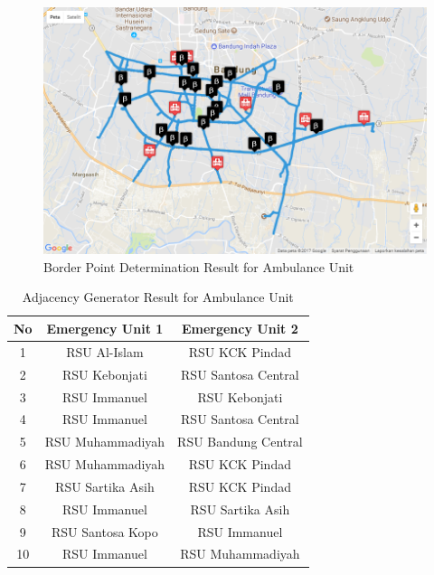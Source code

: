 \begin{figure}[H]
    \centering
    \includegraphics[scale=0.6]{v_border_point_amb.png}
    \caption{Border Point Determination Result for Ambulance Unit}
    \label{fig:bp_amb}
\end{figure}

\begin{table}[H]
\centering
\begin{tabular}{|c|c|c|}
\hline
\textbf{No} & \textbf{Emergency Unit 1} & \textbf{Emergency Unit 2} \\ \hline
1           & RSU Al-Islam              & RSU KCK Pindad            \\ \hline
2           & RSU Kebonjati             & RSU Santosa Central       \\ \hline
3           & RSU Immanuel              & RSU Kebonjati             \\ \hline
4           & RSU Immanuel              & RSU Santosa Central       \\ \hline
5           & RSU Muhammadiyah          & RSU Bandung Central       \\ \hline
6           & RSU Muhammadiyah          & RSU KCK Pindad            \\ \hline
7           & RSU Sartika Asih          & RSU KCK Pindad            \\ \hline
8           & RSU Immanuel              & RSU Sartika Asih          \\ \hline
9           & RSU Santosa Kopo          & RSU Immanuel              \\ \hline
10          & RSU Immanuel              & RSU Muhammadiyah          \\ \hline
\end{tabular}
\caption{Adjacency Generator Result for Ambulance Unit}
\label{table:adj_amb}
\end{table}

